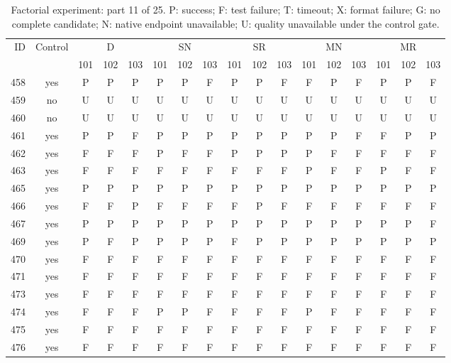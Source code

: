 \begin{table}[p]\centering\footnotesize
\setlength{\tabcolsep}{3pt}
\caption{Factorial experiment: part 11 of 25. P: success; F: test failure; T: timeout; X: format failure; G: no complete candidate; N: native endpoint unavailable; U: quality unavailable under the control gate.}
\begin{tabular*}{\textwidth}{@{\extracolsep{\fill}}rcccccccccccccccc}\toprule
ID & Control & \multicolumn{3}{c}{D} & \multicolumn{3}{c}{SN} & \multicolumn{3}{c}{SR} & \multicolumn{3}{c}{MN} & \multicolumn{3}{c}{MR}\\
\cmidrule(lr){3-5}\cmidrule(lr){6-8}\cmidrule(lr){9-11}\cmidrule(lr){12-14}\cmidrule(lr){15-17}
 & & 101 & 102 & 103 & 101 & 102 & 103 & 101 & 102 & 103 & 101 & 102 & 103 & 101 & 102 & 103\\\midrule
458 & yes & P & P & P & P & P & F & P & P & F & F & P & F & P & P & F\\
459 & no & U & U & U & U & U & U & U & U & U & U & U & U & U & U & U\\
460 & no & U & U & U & U & U & U & U & U & U & U & U & U & U & U & U\\
461 & yes & P & P & F & P & P & P & P & P & P & P & P & F & F & P & P\\
462 & yes & F & F & F & P & F & F & P & P & P & P & F & F & F & F & F\\
463 & yes & F & F & F & F & F & F & F & F & F & P & F & F & P & F & F\\
465 & yes & P & P & P & P & P & P & P & P & P & P & P & P & P & P & P\\
466 & yes & F & F & P & F & F & F & F & P & F & F & F & F & F & F & F\\
467 & yes & P & P & P & P & P & P & P & P & P & P & P & P & P & P & F\\
469 & yes & P & F & P & P & P & P & F & P & P & P & P & P & P & P & P\\
470 & yes & F & F & F & F & F & F & F & F & F & F & F & F & F & F & F\\
471 & yes & F & F & F & F & F & F & F & F & F & F & F & F & F & F & F\\
473 & yes & F & F & F & F & F & F & F & F & F & F & F & F & F & F & F\\
474 & yes & F & F & F & P & P & F & F & F & F & P & F & F & F & F & F\\
475 & yes & F & F & F & F & F & F & F & F & F & F & F & F & F & F & F\\
476 & yes & F & F & F & F & F & F & F & F & F & F & F & F & F & F & F\\

\end{tabular*}
\end{table}
